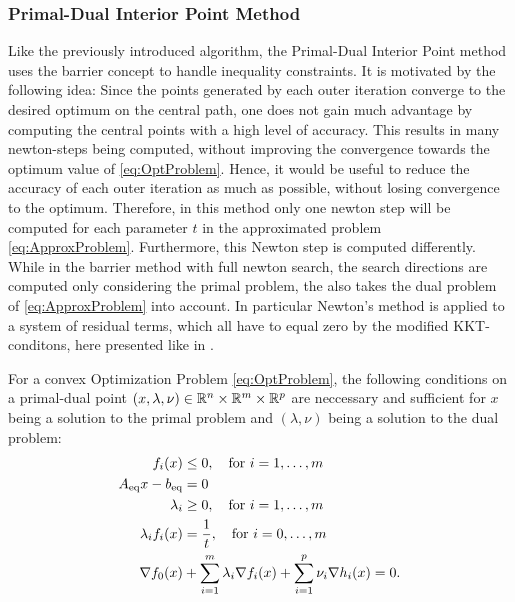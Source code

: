\subsubsection{Primal-Dual Interior Point Method}
Like the previously introduced algorithm, the Primal-Dual Interior Point method uses the barrier concept to handle inequality constraints. It is motivated by the following idea: Since the points generated by each outer iteration converge to the desired optimum on the central path, one does not gain much advantage by computing the central points with a high level of accuracy. This results in many newton-steps being computed, without improving the convergence towards the optimum value of \eqref{eq:OptProblem}. Hence, it would be useful to reduce the accuracy of each outer iteration as much as possible, without losing convergence to the optimum. Therefore, in this method only one newton step will be computed for each parameter $ t $ in the approximated problem  \eqref{eq:ApproxProblem}. Furthermore, this Newton step is computed differently. While in the barrier method with full newton search,  the search directions are computed only considering the primal problem, the \pdm also takes the dual problem of \eqref{eq:ApproxProblem} into account. In particular Newton's method is applied to a system of residual terms, which all have to equal zero by the modified KKT-conditons, here presented like in \cite{BV}.\\
\begin{theorem}
	For a convex Optimization Problem \eqref{eq:OptProblem}, the following conditions on a primal-dual point $ (x,\lambda,\nu) \in \mathbb{R}^n \times \mathbb{R}^m \times \mathbb{R}^p$ are neccessary and sufficient for $ x $ being a solution to the primal problem and $ (\lambda, \nu) $ being a solution to the dual problem:
	\begin{subequations}
			\begin{align}
		f_i(x) &\leq 0, \quad \text{for } i = 1,\dots,m\\
		{A}_{\mathrm{eq}} x - {b}_{\mathrm{eq}} &= 0\\
		\lambda_i &\geq 0,  \quad \text{for } i = 1,\dots,m\\
		\lambda_i f_i(x) & = \frac{1}{t}, \quad \text{for } i = 0, \dots,m\\
		\nabla f_0(x) &+ \sum_{i=1}^{m} \lambda_i \nabla f_i(x) + \sum_{i=1}^{p} \nu_i \nabla h_i (x) = 0.
		\end{align}
	\end{subequations}
\end{theorem}

